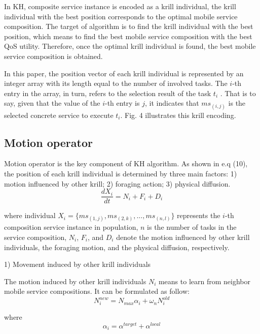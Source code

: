 \documentclass[10pt,journal,compsoc]{IEEEtran}
\begin{document}
In KH, composite service instance is encoded as a krill individual, the krill individual with the best position corresponds to the optimal mobile service composition. The target of algorithm is to find the krill individual with the best position, which means to find the best mobile service composition with the best QoS utility. Therefore, once the optimal krill individual is found, the best mobile service composition is obtained.

In this paper, the position vector of each krill individual is represented by an integer array with its length equal to the number of involved tasks. The $i$-th entry in the array, in turn, refers to the selection result of the task $t_i$ . That is to say, given that the value of the $i$-th entry is $j$, it indicates that $ms_{(i,j)}$ is the selected concrete service to execute $t_i$. Fig. 4 illustrates this krill encoding.



\subsection{Motion operator}
% 
% 

Motion operator is the key component of KH algorithm. As shown in e.q (10), the position of each krill individual is determined by three main factors: 1) motion influenced by other krill; 2) foraging action; 3) physical diffusion. 
\begin{equation}
\frac{dX_i}{dt} =N_i+F_i+D_i
\end{equation}

where individual $X_i = \{ms_{(1,j)}, ms_{(2,k)}, . . . , ms_{(n,l)}\}$ represents the $i$-th composition service instance in population, $n$ is the number of tasks in the service composition, $N_i$, $F_i$, and $D_i$ denote the motion influenced by other krill individuals, the foraging motion, and the physical diffusion, respectively.

1) Movement induced by other krill individuals

The motion induced by other krill individuals $N_i$ means to learn from neighbor mobile service compositions. It can be formulated as follow:
\begin{equation}
N^{new}_i = N_{max}\alpha_i + \omega_n N^{old}_i
\end{equation}

where
\begin{equation}
\alpha_i = \alpha^{target} + \alpha^{local}
\end{equation}
\end{document}
